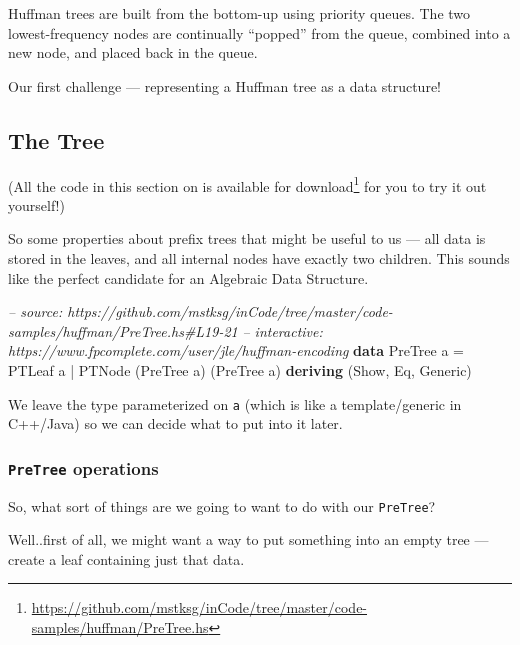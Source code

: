 \documentclass[]{article}
\newenvironment{Shaded}{}{}
\newcommand{\KeywordTok}[1]{\textcolor[rgb]{0.00,0.44,0.13}{\textbf{#1}}}
\newcommand{\DataTypeTok}[1]{\textcolor[rgb]{0.56,0.13,0.00}{#1}}
\newcommand{\CommentTok}[1]{\textcolor[rgb]{0.38,0.63,0.69}{\textit{#1}}}
\newcommand{\FunctionTok}[1]{\textcolor[rgb]{0.02,0.16,0.49}{#1}}
\newcommand{\NormalTok}[1]{#1}
\renewcommand{\href}[2]{#2\footnote{\url{#1}}}
\begin{document}
Huffman trees are built from the bottom-up using priority queues. The two
lowest-frequency nodes are continually ``popped'' from the queue, combined into
a new node, and placed back in the queue.

Our first challenge --- representing a Huffman tree as a data structure!

\subsection{The Tree}\label{the-tree}

(All the code in this section on is
\href{https://github.com/mstksg/inCode/tree/master/code-samples/huffman/PreTree.hs}{available
for download} for you to try it out yourself!)

So some properties about prefix trees that might be useful to us --- all data is
stored in the leaves, and all internal nodes have exactly two children. This
sounds like the perfect candidate for an Algebraic Data Structure.

\begin{Shaded}
\begin{Highlighting}[]
\CommentTok{-- source: https://github.com/mstksg/inCode/tree/master/code-samples/huffman/PreTree.hs#L19-21}
\CommentTok{-- interactive: https://www.fpcomplete.com/user/jle/huffman-encoding}
\KeywordTok{data} \DataTypeTok{PreTree}\NormalTok{ a }\FunctionTok{=} \DataTypeTok{PTLeaf}\NormalTok{ a}
               \FunctionTok{|} \DataTypeTok{PTNode}\NormalTok{ (}\DataTypeTok{PreTree}\NormalTok{ a) (}\DataTypeTok{PreTree}\NormalTok{ a)}
               \KeywordTok{deriving}\NormalTok{ (}\DataTypeTok{Show}\NormalTok{, }\DataTypeTok{Eq}\NormalTok{, }\DataTypeTok{Generic}\NormalTok{)}
\end{Highlighting}
\end{Shaded}

We leave the type parameterized on \texttt{a} (which is like a template/generic
in C++/Java) so we can decide what to put into it later.

\subsubsection{\texorpdfstring{\texttt{PreTree}
operations}{PreTree operations}}\label{pretree-operations}

So, what sort of things are we going to want to do with our \texttt{PreTree}?

Well..first of all, we might want a way to put something into an empty tree ---
create a leaf containing just that data.
\end{document}
